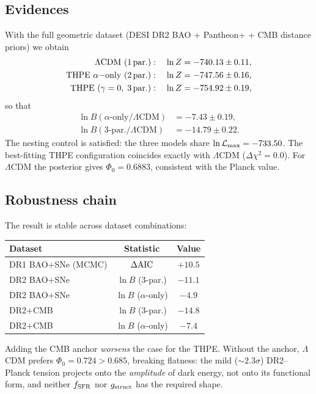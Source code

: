 \documentclass[aps,prd,twocolumn,superscriptaddress,nofootinbib,floatfix]{revtex4-2}
\newcommand{\LCDM}{\ensuremath{\Lambda}CDM}
\begin{document}
\subsection{Evidences}

With the full geometric dataset (DESI DR2 BAO + Pantheon+ + CMB
distance priors) we obtain
%
\begin{align}
\Lambda\mathrm{CDM}~(1\,{\rm par.}) &: \quad \ln Z=-740.13\pm0.11,\nonumber\\
{\rm THPE}~\alpha{\rm -only}~(2\,{\rm par.}) &: \quad \ln Z=-747.56\pm0.16,\nonumber\\
{\rm THPE}~(\gamma=0,\;3\,{\rm par.}) &: \quad \ln Z=-754.92\pm0.19,
\end{align}
%
so that
%
\begin{align}
\ln B(\alpha\text{-only}/\Lambda\mathrm{CDM}) &= -7.43\pm0.19,\label{eq:lnB1}\\
\ln B(\text{3-par.}/\Lambda\mathrm{CDM}) &= -14.79\pm0.22.\label{eq:lnB2}
\end{align}
%
The nesting control is satisfied: the three models share
$\ln\mathcal{L}_{\rm max}=-733.50$. The best-fitting THPE configuration
coincides exactly with \LCDM{} ($\Delta\chi^2=0.0$). For \LCDM{} the
posterior gives $\Phi_0=0.6883$, consistent with the Planck value.

\subsection{Robustness chain}

The result is stable across dataset combinations:
%
\begin{center}
\begin{tabular}{lcc}
\hline\hline
Dataset & Statistic & Value \\
\hline
DR1 BAO+SNe (MCMC) & $\Delta{\rm AIC}$ & $+10.5$ \\
DR2 BAO+SNe & $\ln B$ (3-par.) & $-11.1$ \\
DR2 BAO+SNe & $\ln B$ ($\alpha$-only) & $-4.9$ \\
DR2+CMB & $\ln B$ (3-par.) & $-14.8$ \\
DR2+CMB & $\ln B$ ($\alpha$-only) & $-7.4$ \\
\hline\hline
\end{tabular}
\end{center}
%
Adding the CMB anchor \emph{worsens} the case for the THPE. Without the
anchor, \LCDM{} prefers $\Phi_0=0.724>0.685$, breaking flatness: the
mild ($\sim2.3\sigma$) DR2--Planck tension projects onto the
\emph{amplitude} of dark energy, not onto its functional form, and
neither $f_{\rm SFR}$ nor $g_{\rm struct}$ has the required shape.
\end{document}
